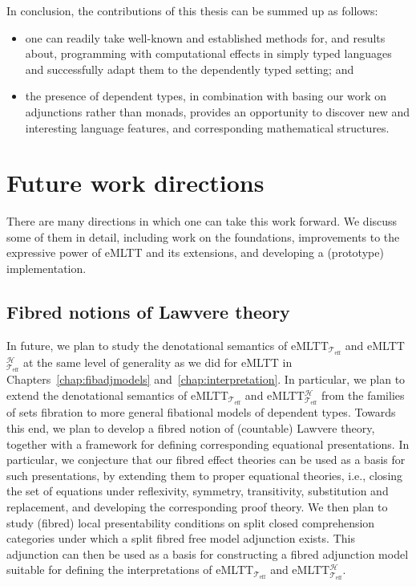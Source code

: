 \vspace{0.3cm}

\noindent
In conclusion, the contributions of this thesis can be summed up as follows:
\begin{itemize}
\item one can readily take well-known and established methods for, and results about, programming with computational effects in simply typed languages and successfully adapt them to the dependently typed setting; and 
\item the presence of dependent types, in combination with basing our work on adjunctions rather than monads, provides an opportunity to discover new and interesting language features, and corresponding mathematical structures.
\end{itemize}



\section{Future work directions}
\label{sect:futurework}

There are many directions in which one can take this work forward. 
We discuss some of them in detail, including work on the foundations, improvements to the expressive power of  
eMLTT and its extensions, and developing a (prototype) implementation. 

\subsection{Fibred notions of Lawvere theory}
\label{sect:fiblawveretheories}

In future, we plan to study the denotational semantics of eMLTT$_{\mathcal{T}_{\text{eff}}}$ and eMLTT$_{\mathcal{T}_{\text{eff}}}^{\mathcal{H}}$ at the same level of generality as we did for eMLTT in Chapters~\ref{chap:fibadjmodels} and~\ref{chap:interpretation}. In particular, we plan to extend the denotational semantics of eMLTT$_{\mathcal{T}_{\text{eff}}}$ and eMLTT$_{\mathcal{T}_{\text{eff}}}^{\mathcal{H}}$ from the families of sets fibration to more general fibational models of dependent types. Towards this end, we plan to develop a fibred notion of (countable) Lawvere theory, together with a framework for defining corresponding equational presentations. In particular, we conjecture that our fibred effect theories can be used as a basis for such presentations, by extending them to proper equational theories, i.e., closing the set of equations under reflexivity, symmetry, transitivity, substitution and replacement, and developing the corresponding proof theory. We then plan to study (fibred) local presentability conditions on split closed comprehension categories under which a split fibred free model adjunction exists. This adjunction can then be used as a basis for constructing a fibred adjunction model suitable for defining the interpretations of eMLTT$_{\mathcal{T}_{\text{eff}}}$ and eMLTT$_{\mathcal{T}_{\text{eff}}}^{\mathcal{H}}$.

